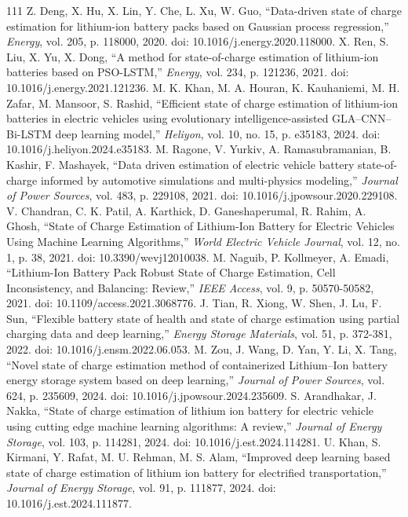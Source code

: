 \documentclass[journal]{IEEEtran}
\begin{document}
\begin{thebibliography}{111}
Z. Deng, X. Hu, X. Lin, Y. Che, L. Xu, W. Guo, ``Data-driven state of charge estimation for lithium-ion battery packs based on Gaussian process regression,'' \emph{Energy}, vol. 205, p. 118000, 2020. doi: 10.1016/j.energy.2020.118000.
X. Ren, S. Liu, X. Yu, X. Dong, ``A method for state-of-charge estimation of lithium-ion batteries based on PSO-LSTM,'' \emph{Energy}, vol. 234, p. 121236, 2021. doi: 10.1016/j.energy.2021.121236.
M. K. Khan, M. A. Houran, K. Kauhaniemi, M. H. Zafar, M. Mansoor, S. Rashid, ``Efficient state of charge estimation of lithium-ion batteries in electric vehicles using evolutionary intelligence-assisted GLA--CNN--Bi-LSTM deep learning model,'' \emph{Heliyon}, vol. 10, no. 15, p. e35183, 2024. doi: 10.1016/j.heliyon.2024.e35183.
M. Ragone, V. Yurkiv, A. Ramasubramanian, B. Kashir, F. Mashayek, ``Data driven estimation of electric vehicle battery state-of-charge informed by automotive simulations and multi-physics modeling,'' \emph{Journal of Power Sources}, vol. 483, p. 229108, 2021. doi: 10.1016/j.jpowsour.2020.229108.
V. Chandran, C. K. Patil, A. Karthick, D. Ganeshaperumal, R. Rahim, A. Ghosh, ``State of Charge Estimation of Lithium-Ion Battery for Electric Vehicles Using Machine Learning Algorithms,'' \emph{World Electric Vehicle Journal}, vol. 12, no. 1, p. 38, 2021. doi: 10.3390/wevj12010038.
M. Naguib, P. Kollmeyer, A. Emadi, ``Lithium-Ion Battery Pack Robust State of Charge Estimation, Cell Inconsistency, and Balancing: Review,'' \emph{IEEE Access}, vol. 9, p. 50570-50582, 2021. doi: 10.1109/access.2021.3068776.
J. Tian, R. Xiong, W. Shen, J. Lu, F. Sun, ``Flexible battery state of health and state of charge estimation using partial charging data and deep learning,'' \emph{Energy Storage Materials}, vol. 51, p. 372-381, 2022. doi: 10.1016/j.ensm.2022.06.053.
M. Zou, J. Wang, D. Yan, Y. Li, X. Tang, ``Novel state of charge estimation method of containerized Lithium--Ion battery energy storage system based on deep learning,'' \emph{Journal of Power Sources}, vol. 624, p. 235609, 2024. doi: 10.1016/j.jpowsour.2024.235609.
S. Arandhakar, J. Nakka, ``State of charge estimation of lithium ion battery for electric vehicle using cutting edge machine learning algorithms: A review,'' \emph{Journal of Energy Storage}, vol. 103, p. 114281, 2024. doi: 10.1016/j.est.2024.114281.
U. Khan, S. Kirmani, Y. Rafat, M. U. Rehman, M. S. Alam, ``Improved deep learning based state of charge estimation of lithium ion battery for electrified transportation,'' \emph{Journal of Energy Storage}, vol. 91, p. 111877, 2024. doi: 10.1016/j.est.2024.111877.

\end{thebibliography}
\end{document}

